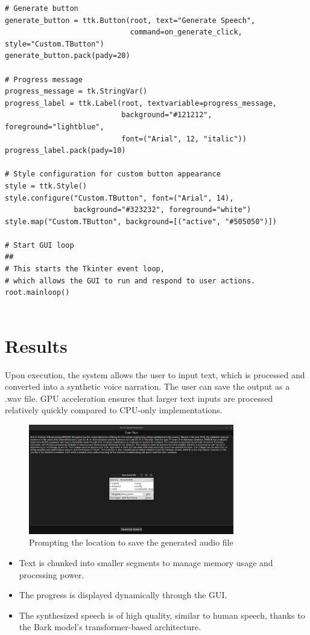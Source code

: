 \documentclass[12pt, a4paper]{article}
\begin{document}
\begin{verbatim}
# Generate button
generate_button = ttk.Button(root, text="Generate Speech", 
                             command=on_generate_click, style="Custom.TButton")
generate_button.pack(pady=20)

# Progress message
progress_message = tk.StringVar()
progress_label = ttk.Label(root, textvariable=progress_message, 
                           background="#121212", foreground="lightblue", 
                           font=("Arial", 12, "italic"))
progress_label.pack(pady=10)

# Style configuration for custom button appearance
style = ttk.Style()
style.configure("Custom.TButton", font=("Arial", 14), 
                background="#323232", foreground="white")
style.map("Custom.TButton", background=[("active", "#505050")])

# Start GUI loop
##
# This starts the Tkinter event loop, 
# which allows the GUI to run and respond to user actions.
root.mainloop()


\end{verbatim}

\section{Results}

Upon execution, the system allows the user to input text, which is processed and converted into a synthetic voice narration. The user can save the output as a .wav file. GPU acceleration ensures that larger text inputs are processed relatively quickly compared to CPU-only implementations.

\begin{figure}[h!]
\centering
\includegraphics[width=0.8\textwidth]{figures/about.png}
\caption{Prompting the location to save the generated audio file}
\label{fig:test_results}
\end{figure}

\begin{itemize}

\item Text is chunked into smaller segments to manage memory usage and processing power.

\item The progress is displayed dynamically through the GUI.

\item The synthesized speech is of high quality, similar to human speech, thanks to the Bark model's transformer-based architecture.

\end{itemize}
\end{document}
